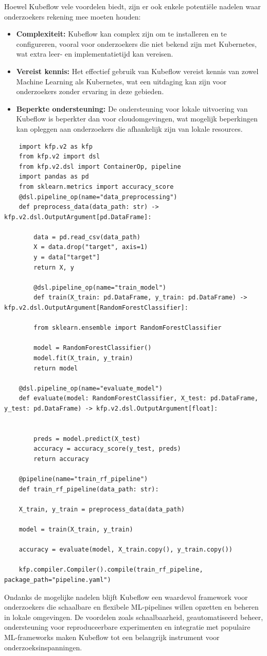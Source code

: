 Hoewel Kubeflow vele voordelen biedt, zijn er ook enkele potentiële nadelen waar onderzoekers rekening mee moeten houden:
\begin{itemize}
    \item \textbf{Complexiteit:} Kubeflow kan complex zijn om te installeren en te configureren, vooral voor onderzoekers die niet bekend zijn met Kubernetes, wat extra leer- en implementatietijd kan vereisen.
    \item \textbf{Vereist kennis:} Het effectief gebruik van Kubeflow vereist kennis van zowel Machine Learning als Kubernetes, wat een uitdaging kan zijn voor onderzoekers zonder ervaring in deze gebieden.
    \item \textbf{Beperkte ondersteuning:} De ondersteuning voor lokale uitvoering van Kubeflow is beperkter dan voor cloudomgevingen, wat mogelijk beperkingen kan opleggen aan onderzoekers die afhankelijk zijn van lokale resources.
\end{itemize}
\begin{verbatim}
    import kfp.v2 as kfp
    from kfp.v2 import dsl
    from kfp.v2.dsl import ContainerOp, pipeline
    import pandas as pd
    from sklearn.metrics import accuracy_score
    @dsl.pipeline_op(name="data_preprocessing")
    def preprocess_data(data_path: str) -> kfp.v2.dsl.OutputArgument[pd.DataFrame]:

        data = pd.read_csv(data_path)
        X = data.drop("target", axis=1)
        y = data["target"]
        return X, y

        @dsl.pipeline_op(name="train_model")
        def train(X_train: pd.DataFrame, y_train: pd.DataFrame) -> kfp.v2.dsl.OutputArgument[RandomForestClassifier]:

        from sklearn.ensemble import RandomForestClassifier

        model = RandomForestClassifier()
        model.fit(X_train, y_train)
        return model

    @dsl.pipeline_op(name="evaluate_model")
    def evaluate(model: RandomForestClassifier, X_test: pd.DataFrame, y_test: pd.DataFrame) -> kfp.v2.dsl.OutputArgument[float]:


        preds = model.predict(X_test)
        accuracy = accuracy_score(y_test, preds)
        return accuracy

    @pipeline(name="train_rf_pipeline")
    def train_rf_pipeline(data_path: str):

    X_train, y_train = preprocess_data(data_path)

    model = train(X_train, y_train)

    accuracy = evaluate(model, X_train.copy(), y_train.copy())

    kfp.compiler.Compiler().compile(train_rf_pipeline, package_path="pipeline.yaml")
\end{verbatim}
Ondanks de mogelijke nadelen blijft Kubeflow een waardevol framework voor onderzoekers die schaalbare en flexibele ML-pipelines willen opzetten en beheren in lokale omgevingen. De voordelen zoals schaalbaarheid, geautomatiseerd beheer, ondersteuning voor reproduceerbare experimenten en integratie met populaire ML-frameworks maken Kubeflow tot een belangrijk instrument voor onderzoeksinspanningen.

